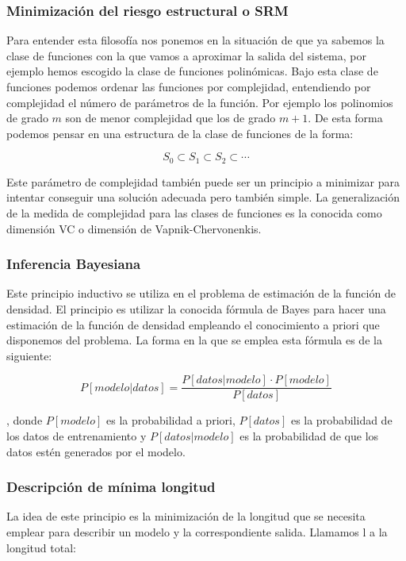 \subsubsection{Minimización del riesgo estructural o SRM}

Para entender esta filosofía nos ponemos en la situación de que ya sabemos la clase de funciones con la que vamos a aproximar la salida del sistema, por ejemplo hemos escogido la clase de funciones polinómicas. Bajo esta clase de funciones podemos ordenar las funciones por complejidad, entendiendo por complejidad el número de parámetros de la función. Por ejemplo los polinomios de grado $m$ son de menor complejidad que los de grado $m+1$. De esta forma podemos pensar en una estructura de la clase de funciones de la forma:

$$S_0 \subset S_1 \subset S_2 \subset \cdots$$

Este parámetro de complejidad también puede ser un principio a minimizar para intentar conseguir una solución adecuada pero también simple. La generalización de la medida de complejidad para las clases de funciones es la conocida como dimensión VC o dimensión de Vapnik-Chervonenkis.

\subsubsection{Inferencia Bayesiana}

Este principio inductivo se utiliza en el problema de estimación de la función de densidad. El principio es utilizar la conocida fórmula de Bayes para hacer una estimación de la función de densidad empleando el conocimiento a priori que disponemos del problema. La forma en la que se emplea esta fórmula es de la siguiente:

$$P[modelo | datos] = \frac{P[datos | modelo] \cdot P[modelo]}{P[datos]}$$

, donde $P[modelo]$ es la probabilidad a priori, $P[datos]$ es la probabilidad de los datos de entrenamiento y $P[datos | modelo]$ es la probabilidad de que los datos estén generados por el modelo.

\subsubsection{Descripción de mínima longitud}

La idea de este principio es la minimización de la longitud que se necesita emplear para describir un modelo y la correspondiente salida. Llamamos l a la longitud total:

